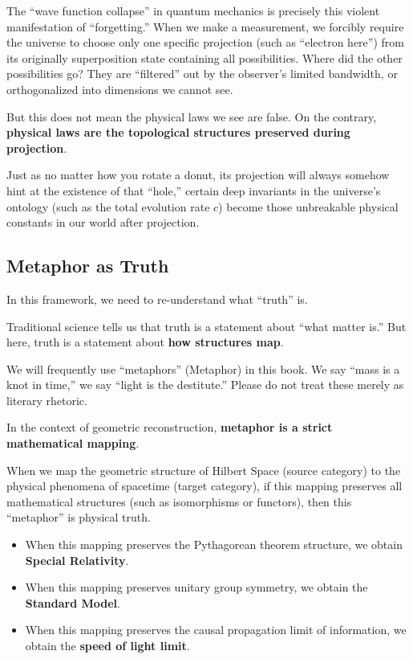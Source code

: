 The ``wave function collapse'' in quantum mechanics is precisely this violent manifestation of ``forgetting.'' When we make a measurement, we forcibly require the universe to choose only one specific projection (such as ``electron here'') from its originally superposition state containing all possibilities. Where did the other possibilities go? They are ``filtered'' out by the observer's limited bandwidth, or orthogonalized into dimensions we cannot see.

But this does not mean the physical laws we see are false. On the contrary, \textbf{physical laws are the topological structures preserved during projection}.

Just as no matter how you rotate a donut, its projection will always somehow hint at the existence of that ``hole,'' certain deep invariants in the universe's ontology (such as the total evolution rate $c$) become those unbreakable physical constants in our world after projection.

\subsection{Metaphor as Truth}

In this framework, we need to re-understand what ``truth'' is.

Traditional science tells us that truth is a statement about ``what matter is.'' But here, truth is a statement about \textbf{how structures map}.

We will frequently use ``metaphors'' (Metaphor) in this book. We say ``mass is a knot in time,'' we say ``light is the destitute.'' Please do not treat these merely as literary rhetoric.

In the context of geometric reconstruction, \textbf{metaphor is a strict mathematical mapping}.

When we map the geometric structure of Hilbert Space (source category) to the physical phenomena of spacetime (target category), if this mapping preserves all mathematical structures (such as isomorphisms or functors), then this ``metaphor'' is physical truth.

\begin{itemize}
\item When this mapping preserves the Pythagorean theorem structure, we obtain \textbf{Special Relativity}.

\item When this mapping preserves unitary group symmetry, we obtain the \textbf{Standard Model}.

\item When this mapping preserves the causal propagation limit of information, we obtain the \textbf{speed of light limit}.
\end{itemize}

